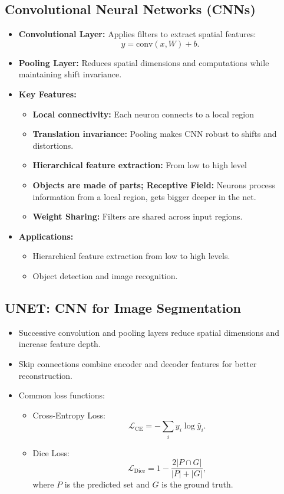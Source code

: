 \documentclass[12pt,a4paper]{article}
\begin{document}
\subsection{Convolutional Neural Networks (CNNs)}
\begin{itemize}
    \item \textbf{Convolutional Layer:} Applies filters to extract spatial features:
    \[ y = \text{conv}(x, W) + b. \]
    \item \textbf{Pooling Layer:} Reduces spatial dimensions and computations while maintaining shift invariance.
    \item \textbf{Key Features:} 
    \begin{itemize}
    \item \textbf{Local connectivity:} Each neuron connects to a local region
    \item \textbf{Translation invariance:} Pooling makes CNN robust to shifts and distortions.
    \item \textbf{Hierarchical feature extraction:} From low to high level 
    \item \textbf{Objects are made of parts; Receptive Field:} Neurons process information from a local region, gets bigger deeper in the net.
        \item \textbf{Weight Sharing:} Filters are shared across input regions.
    \end{itemize}
    \item \textbf{Applications:}
    \begin{itemize}
        \item Hierarchical feature extraction from low to high levels.
        \item Object detection and image recognition.
    \end{itemize}
\end{itemize}

\subsection{UNET: CNN for Image Segmentation}
\begin{itemize}
    \item Successive convolution and pooling layers reduce spatial dimensions and increase feature depth.
    \item Skip connections combine encoder and decoder features for better reconstruction.
    \item Common loss functions:
    \begin{itemize}
        \item Cross-Entropy Loss:
        \[ \mathcal{L}_{\text{CE}} = -\sum_{i} y_i \log \hat{y}_i. \]
        \item Dice Loss:
        \[ \mathcal{L}_{\text{Dice}} = 1 - \frac{2 |P \cap G|}{|P| + |G|}, \]
        where $P$ is the predicted set and $G$ is the ground truth.
    \end{itemize}
\end{itemize}
\end{document}
